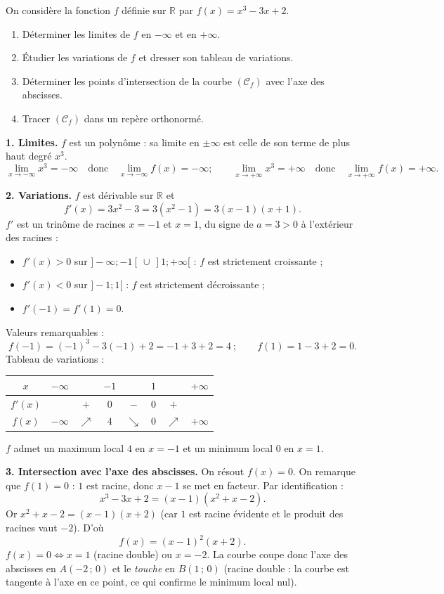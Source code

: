 \documentclass[11pt]{article}
\newcommand{\cle}[1]{{\popxbold\color{popdark}#1}}
\begin{document}
\begin{exoresolu}[Étude de $f(x)=x^3-3x+2$ (type Bac A)]
On considère la fonction $f$ définie sur $\mathbb{R}$ par $f(x)=x^3-3x+2$.
\begin{enumerate}
\item Déterminer les limites de $f$ en $-\infty$ et en $+\infty$.
\item Étudier les variations de $f$ et dresser son tableau de variations.
\item Déterminer les points d'intersection de la courbe $(\mathcal{C}_f)$ avec l'axe des abscisses.
\item Tracer $(\mathcal{C}_f)$ dans un repère orthonormé.
\end{enumerate}
\tcblower
\textbf{1. Limites.} $f$ est un polynôme : sa limite en $\pm\infty$ est celle de son terme de plus haut degré $x^3$.
\[
\lim_{x\to -\infty} x^3=-\infty \quad\text{donc}\quad \lim_{x\to -\infty} f(x)=-\infty ;
\qquad
\lim_{x\to +\infty} x^3=+\infty \quad\text{donc}\quad \lim_{x\to +\infty} f(x)=+\infty.
\]

\textbf{2. Variations.} $f$ est dérivable sur $\mathbb{R}$ et
\[
f'(x)=3x^2-3=3(x^2-1)=3(x-1)(x+1).
\]
$f'$ est un trinôme de racines $x=-1$ et $x=1$, du signe de $a=3>0$ à l'extérieur des racines :
\begin{itemize}
\item $f'(x)>0$ sur $]-\infty;-1[\ \cup\ ]1;+\infty[$ : $f$ est strictement croissante ;
\item $f'(x)<0$ sur $]-1;1[$ : $f$ est strictement décroissante ;
\item $f'(-1)=f'(1)=0$.
\end{itemize}
Valeurs remarquables :
\[
f(-1)=(-1)^3-3(-1)+2=-1+3+2=4 \ ;\qquad f(1)=1-3+2=0.
\]
Tableau de variations :
\begin{center}
\begin{tabular}{|c|ccccccc|}
\hline
$x$ & $-\infty$ & & $-1$ & & $1$ & & $+\infty$ \\
\hline
$f'(x)$ & & $+$ & $0$ & $-$ & $0$ & $+$ & \\
\hline
$f(x)$ & $-\infty$ & $\nearrow$ & $4$ & $\searrow$ & $0$ & $\nearrow$ & $+\infty$ \\
\hline
\end{tabular}
\end{center}
$f$ admet un \cle{maximum local} $4$ en $x=-1$ et un \cle{minimum local} $0$ en $x=1$.

\textbf{3. Intersection avec l'axe des abscisses.} On résout $f(x)=0$. On remarque que $f(1)=0$ : $1$ est racine, donc $x-1$ se met en facteur. Par identification :
\[
x^3-3x+2=(x-1)(x^2+x-2).
\]
Or $x^2+x-2=(x-1)(x+2)$ (car $1$ est racine évidente et le produit des racines vaut $-2$). D'où
\[
f(x)=(x-1)^2(x+2).
\]
$f(x)=0 \iff x=1$ (racine double) ou $x=-2$. La courbe coupe donc l'axe des abscisses en $A(-2\,;\,0)$ et le \emph{touche} en $B(1\,;\,0)$ (racine double : la courbe est tangente à l'axe en ce point, ce qui confirme le minimum local nul).


\end{exoresolu}
\end{document}
